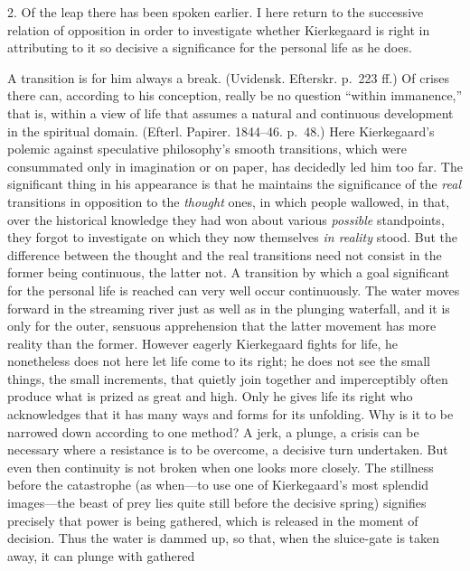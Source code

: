 \documentclass[12pt,a4paper]{book}
\newcommand{\opage}[1]{\marginnote{\footnotesize\textit{[#1]}}}
\begin{document}
2. Of the leap there has been spoken earlier. I here return to the
successive relation of opposition in order to
\opage{121}investigate whether Kierkegaard is right in attributing to it
so decisive a significance for the personal life as he does.

A transition is for him always a break. (Uvidensk. Efterskr. p.~223 ff.)
Of crises there can, according to his conception, really be no question
``within immanence,'' that is, within a view of life that assumes a
natural and continuous development in the spiritual domain. (Efterl.
Papirer. 1844--46. p.~48.) Here Kierkegaard's polemic against
speculative philosophy's smooth transitions, which were consummated only
in imagination or on paper, has decidedly led him too far. The
significant thing in his appearance is that he maintains the
significance of the \textit{real} transitions in opposition to the
\textit{thought} ones, in which people wallowed, in that, over the
historical knowledge they had won about various \textit{possible}
standpoints, they forgot to investigate on which they now themselves
\textit{in reality} stood. But the difference between the thought and
the real transitions need not consist in the former being continuous,
the latter not. A transition by which a goal significant for the
personal life is reached can very well occur continuously. The water
moves forward in the streaming river just as well as in the plunging
waterfall, and it is only for the outer, sensuous apprehension that the
latter movement has more reality than the former. However eagerly
Kierkegaard fights for life, he nonetheless does not here let life come
to its right; he does not see the small things, the small increments,
that quietly join together and imperceptibly often produce what is
prized as great and high. Only he gives life its right who acknowledges
that it has many ways and forms for its unfolding. Why is it to be
narrowed down according to one method? A jerk, a plunge, a crisis can be
necessary where a resistance is to be overcome, a decisive turn
undertaken. But even then
\opage{122}continuity is not broken when one looks more closely. The
stillness before the catastrophe (as when---to use one of Kierkegaard's
most splendid images---the beast of prey lies quite still before the
decisive spring) signifies precisely that power is being gathered, which
is released in the moment of decision. Thus the water is dammed up, so
that, when the sluice-gate is taken away, it can plunge with gathered
\end{document}
